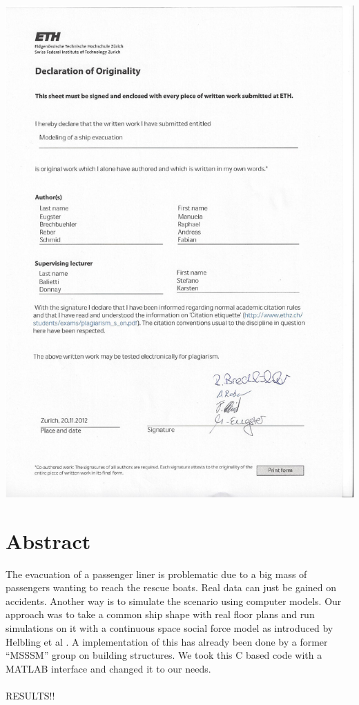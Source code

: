 \documentclass[11pt]{article}
\begin{document}
\includegraphics[width=\textwidth]{declaration.jpg}




\tableofcontents

\newpage




\section{Abstract}
The evacuation of a passenger liner is problematic due to a big mass of passengers wanting to reach the rescue boats. Real data can just be gained on accidents. Another way is to simulate the scenario using computer models. Our approach was to take a common ship shape with real floor plans and run simulations on it with a continuous space social force model as introduced by Helbling et al \cite{EscapePanic}. A implementation of this has already been done by a former “MSSSM” group \cite{Building} on building structures. We took this C based code with a MATLAB interface and changed it to our needs. \\\\
RESULTS!!
\end{document}

